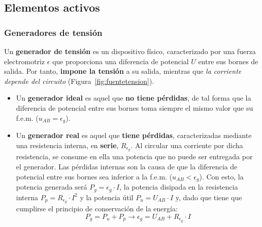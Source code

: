         \subsection{Elementos activos}\label{sec.elementos_activos}
	
	\subsubsection{Generadores de tensión}
	Un \textbf{generador de tensión} es un dispositivo físico,
        caracterizado por una fuerza electromotriz $\epsilon$ que
        proporciona una diferencia de potencial $U$ entre sus bornes
        de salida. Por tanto, \textbf{impone la tensión} a su salida,
        mientras que \emph{la corriente depende del circuito}
        (Figura~\ref{fig:fuentetension}).
	\begin{itemize}
        \item Un \textbf{generador ideal} es aquel que \textbf{no
            tiene pérdidas}, de tal forma que la diferencia de
          potencial entre sus bornes toma siempre el mismo valor que
          su f.e.m. ($u_{AB}=\epsilon_g$).
        \item Un \textbf{generador real} es aquel que \textbf{tiene
            pérdidas}, caracterizadas mediante una resistencia
          interna, en \textbf{serie}, $R_{\epsilon_g}$. Al circular
          una corriente por dicha resistencia, se consume en ella una
          potencia que no puede ser entregada por el generador. Las
          pérdidas internas son la causa de que la diferencia de
          potencial entre sus bornes sea inferior a la
          f.e.m. ($u_{AB}<\epsilon_g$). Con esto, la potencia generada
          será $P_g=\epsilon_g\cdot I$, la potencia disipada en la
          resistencia interna $P_p=R_{\epsilon_g}\cdot I^2$ y la
          potencia útil $P_u=U_{AB}\cdot I$ y, dado que tiene que
          cumplirse el principio de conservación de la energía:
          \begin{equation}
            P_g=P_u+P_p\rightarrow \boxed{ \epsilon_g=U_{AB}+ R_{\epsilon_g}\cdot I}
          \end{equation}
	\end{itemize}

